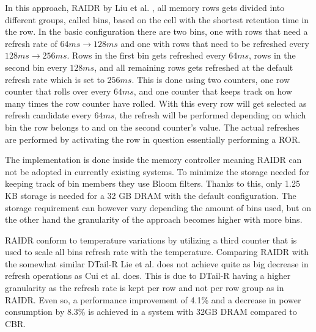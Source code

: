 In this approach, RAIDR by Liu et al. \cite{raidr}, all memory rows gets divided into different groups, called bins, based on the cell with the shortest retention time in the row. In the basic configuration there are two bins, one with rows that need a refresh rate of $64ms \to 128ms$ and one with rows that need to be refreshed every $128ms \to 256ms$. Rows in the first bin gets refreshed every $64ms$, rows in the second bin every $128ms$, and all remaining rows gets refreshed at the default refresh rate which is set to $256ms$. This is done using two counters, one row counter that rolls over every $64ms$, and one counter that keeps track on how many times the row counter have rolled. With this every row will get selected as refresh candidate every $64ms$, the refresh will be performed depending on which bin the row belongs to and on the second counter's value. The actual refreshes are performed by activating the row in question essentially performing a ROR.

The implementation is done inside the memory controller meaning RAIDR can not be adopted in currently existing systems. To minimize the storage needed for keeping track of bin members they use Bloom filters. Thanks to this, only 1.25 KB storage is needed for a 32 GB DRAM with the default configuration. The storage requirement can however vary depending the amount of bins used, but on the other hand the granularity of the approach becomes higher with more bins. 

RAIDR conform to temperature variations by utilizing a third counter that is used to scale all bins refresh rate with the temperature. Comparing RAIDR with the somewhat similar DTail-R Lie et al. does not achieve quite as big decrease in refresh operations as Cui et al. does. This is due to DTail-R having a higher granularity as the refresh rate is kept per row and not per row group as in RAIDR. Even so, a performance improvement of 4.1\% and a decrease in power consumption by 8.3\% is achieved in a system with 32GB DRAM compared to CBR.